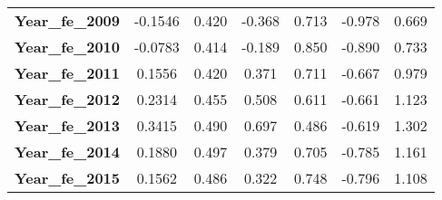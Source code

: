 \begin{center}
\begin{tabular}{lcccccc}
\textbf{Year\_fe\_2009}                              &      -0.1546  &        0.420     &    -0.368  &         0.713        &       -0.978    &        0.669     \\
\textbf{Year\_fe\_2010}                              &      -0.0783  &        0.414     &    -0.189  &         0.850        &       -0.890    &        0.733     \\
\textbf{Year\_fe\_2011}                              &       0.1556  &        0.420     &     0.371  &         0.711        &       -0.667    &        0.979     \\
\textbf{Year\_fe\_2012}                              &       0.2314  &        0.455     &     0.508  &         0.611        &       -0.661    &        1.123     \\
\textbf{Year\_fe\_2013}                              &       0.3415  &        0.490     &     0.697  &         0.486        &       -0.619    &        1.302     \\
\textbf{Year\_fe\_2014}                              &       0.1880  &        0.497     &     0.379  &         0.705        &       -0.785    &        1.161     \\
\textbf{Year\_fe\_2015}                              &       0.1562  &        0.486     &     0.322  &         0.748        &       -0.796    &        1.108     \\
\bottomrule
\end{tabular}
\end{center}